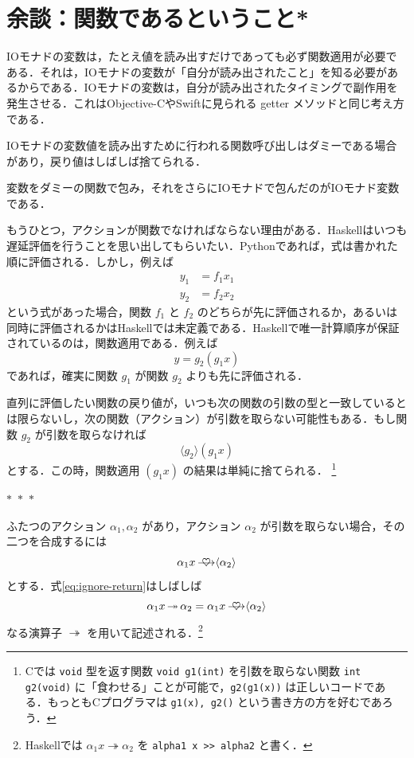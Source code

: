 \documentclass[a5paper,twoside,fleqn,draft]{jsbook}
\newcommand{\separator}{\begin{center}$*$~$*$~$*$\end{center}}
\newcommand{\programminglanguage}[1]{\textsf{#1}}
\newcommand{\clang}{\programminglanguage{C}}
\newcommand{\haskell}{\programminglanguage{Haskell}}
\newcommand{\objectivec}{\programminglanguage{Objective-C}}
\newcommand{\python}{\programminglanguage{Python}}
\newcommand{\swift}{\programminglanguage{Swift}}
\newcommand{\code}[1]{\texttt{#1}}
\DeclareMathOperator{\mBind}{\heartsuit}
\DeclareMathOperator{\mBindRight}{\ooalign{$\longrightarrow$\crcr\hss$\mBind$\hss}}
\DeclareMathOperator{\mBindRightIgnore}{\twoheadrightarrow}
\newcommand{\mConstWith}[1]{\langle#1\rangle}
\begin{document}
\section{余談：関数であるということ*}

IOモナドの変数は，たとえ値を読み出すだけであっても必ず関数適用が必要である．それは，IOモナドの変数が「自分が読み出されたこと」を知る必要があるからである．IOモナドの変数は，自分が読み出されたタイミングで副作用を発生させる．これは\objectivec や\swift に見られる getter メソッドと同じ考え方である．

IOモナドの変数値を読み出すために行われる関数呼び出しはダミーである場合があり，戻り値はしばしば捨てられる．

変数をダミーの関数で包み，それをさらにIOモナドで包んだのがIOモナド変数である．

もうひとつ，アクションが関数でなければならない理由がある．\haskell はいつも遅延評価を行うことを思い出してもらいたい．\python であれば，式は書かれた順に評価される．しかし，例えば
\begin{align}
y_1&=f_1x_1\\
y_2&=f_2x_2
\end{align}
という式があった場合，関数 $f_1$ と $f_2$ のどちらが先に評価されるか，あるいは同時に評価されるかは\haskell では未定義である．\haskell で唯一計算順序が保証されているのは，関数適用である．例えば
\begin{equation}
y=g_2(g_1x)
\end{equation}
であれば，確実に関数 $g_1$ が関数 $g_2$ よりも先に評価される．

直列に評価したい関数の戻り値が，いつも次の関数の引数の型と一致しているとは限らないし，次の関数（アクション）が引数を取らない可能性もある．もし関数 $g_2$ が引数を取らなければ
\begin{equation}
\mConstWith{g_2}(g_1x)
\end{equation}
とする．この時，関数適用 $(g_1x)$ の結果は単純に捨てられる．
\footnote{\clang では \code{void} 型を返す関数 \code{void g1(int)} を引数を取らない関数 \code{int g2(void)} に「食わせる」ことが可能で，\code{g2(g1(x))} は正しいコードである．もっとも\clang プログラマは \code{g1(x), g2()} という書き方の方を好むであろう．}

\separator

ふたつのアクション $\alpha_1,\alpha_2$ があり，アクション $\alpha_2$ が引数を取らない場合，その二つを合成するには
\begin{equation}
\label{eq:ignore-return}
\alpha_1 x\mBindRight\mConstWith{\alpha_2}
\end{equation}
とする．式\eqref{eq:ignore-return}はしばしば
\begin{equation}
\alpha_1 x\mBindRightIgnore\alpha_2=\alpha_1x\mBindRight\mConstWith{\alpha_2}
\end{equation}
なる演算子 $\mBindRightIgnore$ を用いて記述される．\footnote{\haskell では $\alpha_1x\mBindRightIgnore\alpha_2$ を \code{alpha1 x >> alpha2} と書く．}
\end{document}
